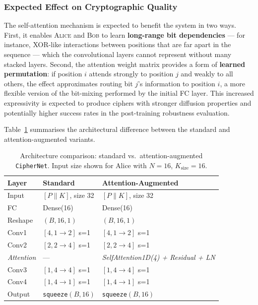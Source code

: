 \documentclass[12pt, a4paper]{article}
\newcommand{\alice}{\textsc{Alice}}
\newcommand{\bob}{\textsc{Bob}}
\newcommand{\code}[1]{\texttt{\color{CodeRed}#1}}
\begin{document}
\subsubsection*{Expected Effect on Cryptographic Quality}

The self-attention mechanism is expected to benefit the system in
two ways. First, it enables \alice{} and \bob{} to learn
\textbf{long-range bit dependencies} — for instance, XOR-like
interactions between positions that are far apart in the sequence —
which the convolutional layers cannot represent without many stacked
layers. Second, the attention weight matrix provides a form of
\textbf{learned permutation}: if position $i$ attends strongly to
position $j$ and weakly to all others, the effect approximates
routing bit $j$'s information to position $i$, a more flexible
version of the bit-mixing performed by the initial FC layer.
This increased expressivity is expected to produce ciphers with
stronger diffusion properties and potentially higher success rates
in the post-training robustness evaluation.

Table~\ref{tab:arch_comparison} summarises the architectural
difference between the standard and attention-augmented variants.

\begin{table}[H]
  \centering
  \caption{Architecture comparison: standard vs.\ attention-augmented
           \code{CipherNet}. Input size shown for Alice with
           $N=16$, $K_{\text{size}}=16$.}
  \label{tab:arch_comparison}
  \small
  \begin{tabular}{@{} l l l @{}}
    \toprule
    \textbf{Layer} & \textbf{Standard} & \textbf{Attention-Augmented} \\
    \midrule
    Input          & $[P \| K]$, size 32  & $[P \| K]$, size 32 \\
    FC             & Dense(16)            & Dense(16) \\
    Reshape        & $(B, 16, 1)$         & $(B, 16, 1)$ \\
    Conv1          & $[4,1{\to}2]$ s=1    & $[4,1{\to}2]$ s=1 \\
    Conv2          & $[2,2{\to}4]$ s=1    & $[2,2{\to}4]$ s=1 \\
    \textit{Attention} & ---              & \textit{SelfAttention1D(4) + Residual + LN} \\
    Conv3          & $[1,4{\to}4]$ s=1    & $[1,4{\to}4]$ s=1 \\
    Conv4          & $[1,4{\to}1]$ s=1    & $[1,4{\to}1]$ s=1 \\
    Output         & \code{squeeze}$(B, 16)$  & \code{squeeze}$(B, 16)$ \\
    \bottomrule
  \end{tabular}
\end{table}
\end{document}
